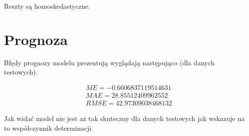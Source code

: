 Reszty są homoskedastyczne.

\newpage

\section{Prognoza}\label{sec:prognoza}

Błędy prognozy modelu prezentują wyglądają następująco (dla danych testowych).

\begin{equation}
    \begin{split}
        &ME = -0.6606837119514631 \\
        &MAE = 28.85512409962552 \\
        &RMSE = 42.97309038468132
    \end{split}
\end{equation}

Jak widać model nie jest aż tak skuteczny dla danych testowych jak wskazuje na to współczynnik determinacji.
